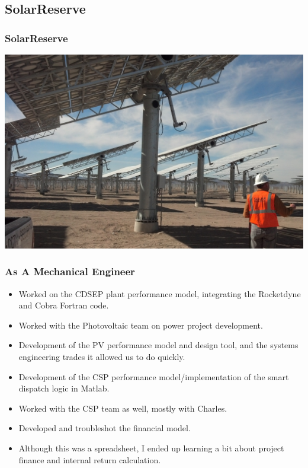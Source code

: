 \documentclass[aspectratio=169]{beamer}
\begin{document}


\subsection{SolarReserve}

\begin{frame}
  \frametitle{SolarReserve}
  \center
  \includegraphics[width=.7\linewidth]{HeliostatImage.jpg}
\end{frame}

\begin{frame}
  \frametitle{As A Mechanical Engineer}
  \begin{itemize}
  \item Worked on the CDSEP plant performance model, integrating the Rocketdyne and Cobra Fortran code.
  \item Worked with the Photovoltaic team on power project development.
  \item Development of the PV performance model and design tool, and the systems engineering trades it allowed us to do quickly.
  \item Development of the CSP performance model/implementation of the smart dispatch logic in Matlab.
  \item Worked with the CSP team as well, mostly with Charles.
  \item Developed and troubleshot the financial model.
  \item Although this was a spreadsheet, I ended up learning a bit about project finance and internal return calculation.
  \end{itemize}
\end{frame}
\end{document}
